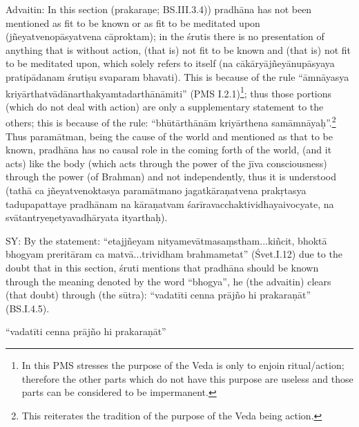 Advaitin: In this section (prakaraṇe; BS.III.3.4)) pradhāna has not been mentioned as fit to be known or as fit to be meditated upon (jñeyatvenopāsyatvena cāproktam); in the śrutis there is no presentation of anything that is without action, (that is) not fit to be known and (that is) not fit to be meditated upon, which solely refers to itself (na cākāryājñeyānupāsyaya pratipādanam śrutiṣu svaparam bhavati). This is because of the rule “āmnāyasya kriyārthatvādānarthakyamtadarthā\-nāmiti” (PMS I.2.1)\footnote{In this PMS stresses the purpose of the Veda is only to enjoin ritual/action; therefore the other parts which do not have this purpose are useless and those parts can be considered to be impermanent.}; thus those portions (which do not deal with action) are only a supplementary statement to the others; this is because of the rule: “bhūtārthānām kriyārthena samāmnāyaḥ”.\footnote{This reiterates the tradition of the purpose of the Veda being action.} Thus paramātman, being the cause of the world  and mentioned as that to be known, pradhāna has no causal role in the coming forth of the world, (and it acts) like the body (which acts through the power of the jīva consciousness) through the power (of Brahman) and not independently, thus it is understood (tathā ca jñeyatvenoktasya paramātmano jagat\-kāraṇatvena prakṛtasya tadupapattaye pradhānam na kāraṇatvam  śarī\-ravacchaktividhayaivocyate, na svātantryeṇetyavadhāryata ityarthaḥ).

SY: By the statement: “etajjñeyam  nityamevātmasaṃstham...kiñcit, bhoktā bhogyam preritāram ca matvā...trividham brahmametat” (Śvet.I.12)  due to the doubt that in this section, śruti mentions that pradhāna should be known through the meaning denoted by the word  “bhogya”, he (the advaitin) clears (that doubt) through (the sūtra): “vadatīti cenna prājño hi prakaraṇāt” (BS.I.4.5).

\vskip 4pt

\textbf{}


\vskip 2pt

“vadatīti cenna prājño hi prakaraṇāt”

